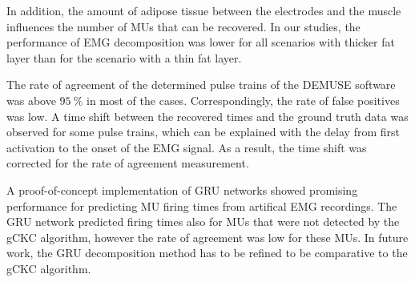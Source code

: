 In addition, the amount of adipose tissue between the electrodes and the muscle influences the number of MUs that can be recovered. In our studies, the performance of EMG decomposition was lower for all scenarios with thicker fat layer than for the scenario with a thin fat layer.

The rate of agreement of the determined pulse trains of the DEMUSE software was above $\SI{95}{\percent}$ in most of the cases. Correspondingly, the rate of false positives was low.
A time shift between the recovered times and the ground truth data was observed for some pulse trains, which can be explained with the delay from first activation to the onset of the EMG signal. As a result, the time shift was corrected for the rate of agreement measurement.

A proof-of-concept implementation of GRU networks showed promising performance for predicting MU firing times from artifical EMG recordings. 
The GRU network predicted firing times also for MUs that were not detected by the gCKC algorithm, however the rate of agreement was low for these MUs.
In future work, the GRU decomposition method has to be refined to be comparative to the gCKC algorithm.




